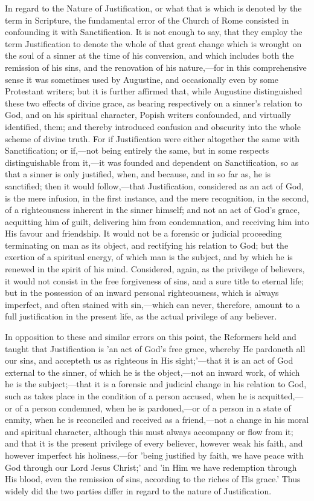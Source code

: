 \documentclass[
]{book}
\begin{document}
In regard to the Nature of Justification, or what that is which is denoted by the term in Scripture, the fundamental error of the Church of Rome consisted in confounding it with Sanctification. It is not enough to say, that they employ the term Justification to denote the whole of that great change which is wrought on the soul of a sinner at the time of his conversion, and which includes both the remission of his sins, and the renovation of his nature,---for in this comprehensive sense it was sometimes used by Augustine, and occasionally even by some Protestant writers; but it is further affirmed that, while Augustine distinguished these two effects of divine grace, as bearing respectively on a sinner's relation to God, and on his spiritual character, Popish writers confounded, and virtually identified, them; and thereby introduced confusion and obscurity into the whole scheme of divine truth. For if Justification were either altogether the same with Sanctification; or if,---not being entirely the same, but in some respects distinguishable from it,---it was founded and dependent on Sanctification, so as that a sinner is only justified, when, and because, and in so far as, he is sanctified; then it would follow,---that Justification, considered as an act of God, is the mere infusion, in the first instance, and the mere recognition, in the second, of a righteousness inherent in the sinner himself; and not an act of God's grace, acquitting him of guilt, delivering him from condemnation, and receiving him into His favour and friendship. It would not be a forensic or judicial proceeding terminating on man as its object, and rectifying his relation to God; but the exertion of a spiritual energy, of which man is the subject, and by which he is renewed in the spirit of his mind. Considered, again, as the privilege of believers, it would not consist in the free forgiveness of sins, and a sure title to eternal life; but in the possession of an inward personal righteousness, which is always imperfect, and often stained with sin,---which can never, therefore, amount to a full justification in the present life, as the actual privilege of any believer.

In opposition to these and similar errors on this point, the Reformers held and taught that Justification is 'an act of God's free grace, whereby He pardoneth all our sins, and accepteth us as righteous in His sight;'---that it is an act of God external to the sinner, of which he is the object,---not an inward work, of which he is the subject;---that it is a forensic and judicial change in his relation to God, such as takes place in the condition of a person accused, when he is acquitted,---or of a person condemned, when he is pardoned,---or of a person in a state of enmity, when he is reconciled and received as a friend,---not a change in his moral and spiritual character, although this must always accompany or flow from it; and that it is the present privilege of every believer, however weak his faith, and however imperfect his holiness,---for 'being justified by faith, we have peace with God through our Lord Jesus Christ;' and 'in Him we have redemption through His blood, even the remission of sins, according to the riches of His grace.' Thus widely did the two parties differ in regard to the nature of Justification.
\end{document}
